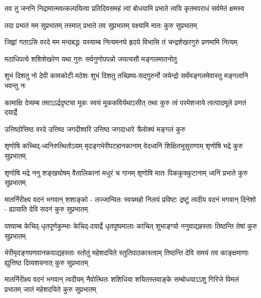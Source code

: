 

{तव तु जननि निद्रामात्मवत्कल्पयित्वा}
{प्रतिदिवसमहं त्वां बोधयामि प्रभाते}
{त्वयि कृतमपराधं सर्वमेतं क्षमस्व}

{तदा प्रभातं मम सुप्रभातम्}
{तस्मात् प्रभाते तव सुप्रभातम्}
{वक्ष्यामि मातः कुरु सुप्रभातम्}

{जिह्वां गताऽसि वरदे मम मन्दबद्धः}
{यस्याम्ब नित्यमनघे हृदये विभासि}
{तं चन्द्रशेखरगुरुं प्रणमामि नित्यम्}

{मठाधिपत्ये शशिशेखरेण}
{यथा गुरुः सर्वगुणोपपन्नो}
{जयत्यसौ मङ्गलमातनोतु}

{शुभं दिशतु नो देवी कामकोटी-मठेशः}
{शुभं दिशतु तच्छिष्य-सद्गुरुर्नो जयेन्द्रो}
{सर्वंमङ्गलमेवास्तु मङ्गलानि भवन्तु नः}

\fourlineindentedshloka
{कामाक्षि देव्यम्ब तवाऽऽर्द्रदृष्ट्या}
{मूकः स्वयं मूककविर्यथाऽसीत्}
{तथा कुरु त्वं परमेशजाये}
{त्वत्पादमूले प्रणतं दयार्द्रे}

\twolineshloka
{उत्तिष्ठोत्तिष्ठ वरदे उत्तिष्ठ जगदीश्वरि}
{उत्तिष्ठ जगदाधारे त्रैलोक्यं मङ्गलं कुरु}

\fourlineindentedshloka
{शृणोषि कच्चिद्-ध्वनिरुत्थितोऽयम्}
{मृदङ्गभेरीपटहानकानाम्}
{वेदध्वनिं शिक्षितभूसुराणाम्}
{शृणोषि भद्रे कुरु सुप्रभातम्}

\fourlineindentedshloka
{शृणोषि भद्रे ननु शङ्खघोषम्}
{वैतालिकानां मधुरं च गानम्}
{शृणोषि मातः पिककुक्कुटानाम्}
{ध्वनिं प्रभाते कुरु सुप्रभातम्}

\fourlineindentedshloka
{मातर्निरीक्ष्य वदनं भगवान् शशाङ्को -}
{लज्जान्वितः स्वयमहो निलयं प्रविष्टः}
{द्रष्टुं त्वदीय वदनं भगवान् दिनेशो -}
{ह्यायाति देवि सदनं कुरु सुप्रभातम्}

\fourlineindentedshloka
{पश्याम्ब केचिद्-धृतपूर्णकुम्भाः}
{केचिद्-दयार्द्रे धृतपुष्पमालाः}
{काचित् शुभाङ्ग्यो ननुवाद्यहस्ताः}
{तिष्ठन्ति तेषां कुरु सुप्रभातम्}

\fourlineindentedshloka
{भेरीमृदङ्गपणवानकवाद्यहस्ताः}
{स्तोतुं महेशदयिते स्तुतिपाठकास्त्वाम्}
{तिष्ठन्ति देवि समयं तव काङ्क्षमाणाः}
{ह्युत्तिष्ठ दिव्यशयनात् कुरु सुप्रभातम्}

\fourlineindentedshloka
{मातर्निरीक्ष्य वदनं भगवान् त्वदीयम्}
{नैवोत्थितः शशिधिया शयितस्तवाङ्के}
{सम्बोधयाऽऽशु गिरिजे विमलं प्रभातम्}
{जातं महेशदयिते कुरु सुप्रभातम्}

